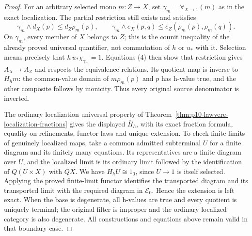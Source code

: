 \begin{proof}
For an arbitrary selected mono \(m:Z\to X\), set
\(\gamma_m=\forall_{X\to1}(m)\) as in the exact localization.
The partial restriction still exists and satisfies
\[
 \gamma_m\wedge d_X(p)\le d_Z\rho_m(p),\qquad
 \gamma_m\wedge e_X(p,q)\le e_Z(\rho_m(p),\rho_m(q)).    \tag{4}
\]
On \(\gamma_m\), every member of \(X\) belongs to \(Z\);
this is the counit inequality of the already proved universal
quantifier, not commutation of \(h\) or \(u_*\) with it.
Selection means precisely that \(h\,u_*\chi_{\gamma_m}=1\).
Equations (4) then show that restriction gives \(A_X\to A_Z\)
and respects the equivalence relations. Its quotient map is inverse
to \(H_hm\): the common-value domain of \(m\rho_m(p)\)
and \(p\) has h-value true, and the other composite follows by
monicity. Thus every original source denominator is inverted.

The ordinary localization universal property of
Theorem~\ref{thm:p10-lawvere-localization-fractions} gives the displayed
\(\overline H_h\), with its exact fraction formula, equality on
refinements, functor laws and unique extension. To check finite limits
of genuinely localized maps, take a common admitted subterminal \(U\)
for a finite diagram and its finitely many equations. Its representatives
are a finite diagram over \(U\), and the localized limit is its
ordinary limit followed by the identification of \(Q(U\times X)\)
with \(QX\). We have \(H_hU\cong1_0\), since \(U\to1\)
is itself selected. Applying the proved finite-limit functor identifies
the transported diagram and its transported limit with the required
diagram in \(\mathcal E_0\). Hence the extension is left exact.
When the base is degenerate, all h-values are true and every quotient
is uniquely terminal; the original filter is improper and the ordinary
localized category is also degenerate. All constructions and equations
above remain valid in that boundary case.
\end{proof}

